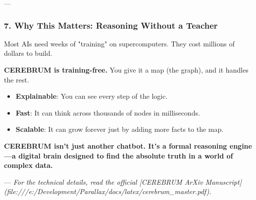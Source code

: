 \documentclass[10pt,journal,compsoc]{IEEEtran}
\begin{document}
---

\subsubsection{\textbf{7. Why This Matters: Reasoning Without a Teacher}}
Most AIs need weeks of "training" on super\-computers. They cost millions of dollars to build.

\textbf{CEREBRUM is training-free.} You give it a map (the graph), and it handles the rest. 
\begin{itemize}
\item \textbf{Explainable}: You can see every step of the logic.
\item \textbf{Fast}: It can think across thousands of nodes in milli\-seconds.
\item \textbf{Scalable}: It can grow forever just by adding more facts to the map.

\end{itemize}
\textbf{CEREBRUM isn't just another chatbot. It’s a formal reasoning engine—a digital brain designed to find the absolute truth in a world of complex data.}

---
\textit{For the technical details, read the official [CEREBRUM ArXiv Manuscript](file:///e:/Development/Parallax/docs/latex/cerebrum\_master.pdf).}




\end{document}

